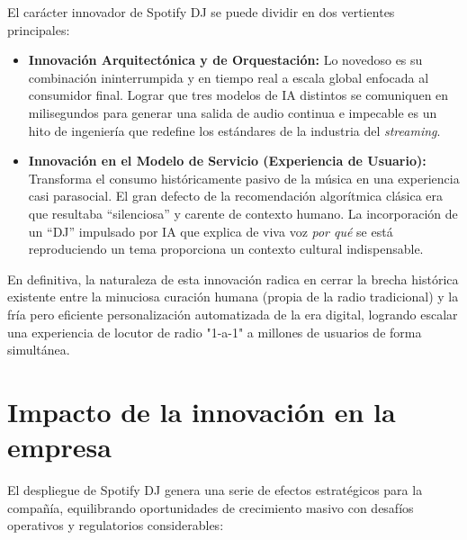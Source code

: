 \documentclass[12pt,a4paper]{article}
\begin{document}
El carácter innovador de Spotify DJ se puede dividir en dos vertientes principales:

\begin{itemize}
    \item \textbf{Innovación Arquitectónica y de Orquestación:} Lo novedoso es su combinación ininterrumpida y en tiempo real a escala global enfocada al consumidor final. Lograr que tres modelos de IA distintos se comuniquen en milisegundos para generar una salida de audio continua e impecable es un hito de ingeniería que redefine los estándares de la industria del \textit{streaming}.
    
    \item \textbf{Innovación en el Modelo de Servicio (Experiencia de Usuario):} Transforma el consumo históricamente pasivo de la música en una experiencia casi parasocial. El gran defecto de la recomendación algorítmica clásica era que resultaba ``silenciosa'' y carente de contexto humano. La incorporación de un ``DJ'' impulsado por IA que explica de viva voz \textit{por qué} se está reproduciendo un tema proporciona un contexto cultural indispensable.
\end{itemize}

En definitiva, la naturaleza de esta innovación radica en cerrar la brecha histórica existente entre la minuciosa curación humana (propia de la radio tradicional) y la fría pero eficiente personalización automatizada de la era digital, logrando escalar una experiencia de locutor de radio "1-a-1" a millones de usuarios de forma simultánea.

\newpage

\section{Impacto de la innovación en la empresa}
El despliegue de Spotify DJ genera una serie de efectos estratégicos para la compañía, equilibrando oportunidades de crecimiento masivo con desafíos operativos y regulatorios considerables:
\end{document}
